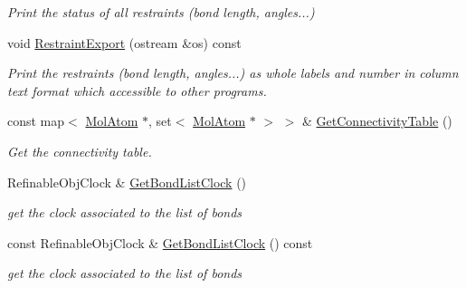 \begin{DoxyCompactItemize}
\begin{DoxyCompactList}\small\item\em Print the status of all restraints (bond length, angles...) \end{DoxyCompactList}\item 
\mbox{\label{class_obj_cryst_1_1_molecule_a9c52af189100bd858eff7bdb16548c78}} 
void \mbox{\hyperlink{class_obj_cryst_1_1_molecule_a9c52af189100bd858eff7bdb16548c78}{Restraint\+Export}} (ostream \&os) const
\begin{DoxyCompactList}\small\item\em Print the restraints (bond length, angles...) as whole labels and number in column text format which accessible to other programs. \end{DoxyCompactList}\item 
\mbox{\label{class_obj_cryst_1_1_molecule_ab8d8da3b17849fb222ff7b1a4078776b}} 
const map$<$ \mbox{\hyperlink{class_obj_cryst_1_1_mol_atom}{Mol\+Atom}} $\ast$, set$<$ \mbox{\hyperlink{class_obj_cryst_1_1_mol_atom}{Mol\+Atom}} $\ast$ $>$ $>$ \& \mbox{\hyperlink{class_obj_cryst_1_1_molecule_ab8d8da3b17849fb222ff7b1a4078776b}{Get\+Connectivity\+Table}} ()
\begin{DoxyCompactList}\small\item\em Get the connectivity table. \end{DoxyCompactList}\item 
\mbox{\label{class_obj_cryst_1_1_molecule_adc60f21b9ed68f0d41abb1603214e881}} 
Refinable\+Obj\+Clock \& \mbox{\hyperlink{class_obj_cryst_1_1_molecule_adc60f21b9ed68f0d41abb1603214e881}{Get\+Bond\+List\+Clock}} ()
\begin{DoxyCompactList}\small\item\em get the clock associated to the list of bonds \end{DoxyCompactList}\item 
\mbox{\label{class_obj_cryst_1_1_molecule_a47e187587392d8d63fc6bde3b2c02dd4}} 
const Refinable\+Obj\+Clock \& \mbox{\hyperlink{class_obj_cryst_1_1_molecule_a47e187587392d8d63fc6bde3b2c02dd4}{Get\+Bond\+List\+Clock}} () const
\begin{DoxyCompactList}\small\item\em get the clock associated to the list of bonds \end{DoxyCompactList}\item 

\end{DoxyCompactItemize}
